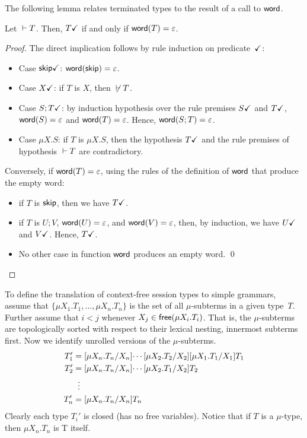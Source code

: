 The following lemma relates terminated types to the result 
of a call to $\word$. 

\begin{lemma}
  \label{lemma:terminated-togrammar}
  Let $\isType[] T$. Then, $\DONE T$ if and only if
  $\word(T) = \varepsilon$.
\end{lemma}
%
\begin{proof}
  The direct implication follows by rule induction on
  predicate~$\DONE$:
  \begin{itemize}
  \item Case $\DONE{\skipk}$: $\word(\skipk) = \varepsilon$.
  \item Case $\DONE{X}$: if $T$ is $X$, then $\isNotType[]T$.
  \item Case $\DONE{S;T}$: by induction hypothesis over the 
    rule premises 
    $\DONE{S}$ and $\DONE{T}$,
    $\word(S) = \varepsilon$ and $\word(T) = \varepsilon$. Hence,
    $\word(S;T) = \varepsilon$.
  \item Case $\mu X.S$: if $T$ is $\mu X.S$, then the hypothesis 
    $\DONE T$ and the rule premises of 
    hypothesis $\isType[]T$ are contradictory.
  \end{itemize}
  Conversely, if $\word(T) = \varepsilon$, using the rules of the definition of
  $\word$ that produce the empty word:
  \begin{itemize}
  \item if $T$ is $\skipk$, then we have $\DONE T$.
  \item if $T$ is $U;V$,
    $\word(U) = \varepsilon$, and $\word(V) = \varepsilon$, then, by
    induction, we have $\DONE U$ and $\DONE V$. Hence, $\DONE T$.
  \item No other case in function $\word$ produces an empty word. \qed
  \end{itemize}
\end{proof}



To define the translation of context-free session types to simple
grammars, assume that $\{\mu X_1.T_1,\dots,\mu X_n.T_n\}$ is the set
of all $\mu$-subterms in a given type~$T$. Further assume that $i<j$
whenever $X_j \in \free(\mu X_i.T_i)$. That is, the $\mu$-subterms are
topologically sorted with respect to their lexical nesting, innermost
subterms first.
%
Now we identify unrolled versions of the $\mu$-subterms.
%
\begin{align*}
  T_1' &= \subs{\mu X_n.T_n}{X_n}{ \cdots \subs{\mu X_2.T_2}{X_2}\subs{\mu X_1.T_1}{X_1}{T_1} }\\
  T_2' &= \subs{\mu X_n.T_n}{X_n}{ \cdots \subs{\mu X_2.T_1}{X_2}{T_2} }\\
       &\;\;\vdots \\
  T_n' &= \subs{\mu X_n.T_n}{X_n}{T_n} 
\end{align*}
%
Clearly each type $T_i'$ is closed (has no free variables).
Notice that if $T$ is a $\mu$-type, then $\mu X_n. T_n$ is T itself.

